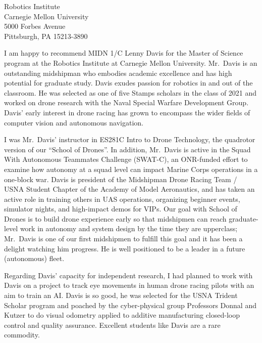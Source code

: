 \documentclass[10pt]{wrceletter}
\date{\today}
\begin{document}
\begin{letter}{%
Robotics Institute\\
Carnegie Mellon University\\
5000 Forbes Avenue\\
Pittsburgh, PA 15213-3890}

\opening{}
\raggedright %
\setlength{\parindent}{15pt} %

I am happy to recommend MIDN 1/C Lenny Davis for the Master of Science program at the Robotics Institute at Carnegie Mellon University.  Mr.~Davis is an outstanding midshipman who embodies academic excellence and has high potential for graduate study. Davis exudes passion for robotics in and out of the classroom. He was selected as one of five Stamps scholars in the class of 2021 and worked on drone research with the Naval Special Warfare Development Group. Davis' early interest in drone racing has grown to encompass the wider fields of computer vision and autonomous navigation.  

I was Mr.~Davis’ instructor in ES281C Intro to Drone Technology, the quadrotor version of our ``School of Drones''. In addition, Mr.~Davis is active in the Squad With Autonomous Teammates Challenge (SWAT-C), an ONR-funded effort to examine how autonomy at a squad level can impact Marine Corps operations in a one-block war. Davis is president of the Midshipman Drone Racing Team / USNA Student Chapter of the Academy of Model Aeronautics, and has taken an active role in training others in UAS operations, organizing beginner events, simulator nights, and high-impact demos for VIPs.  Our goal with School of Drones is to build drone experience early so that midshipmen can reach graduate-level work in autonomy and system design by the time they are upperclass; Mr.~Davis is one of our first midshipmen to fulfill this goal and it has been a delight watching him progress. He is well positioned to be a leader in a future (autonomous) fleet. 

Regarding Davis' capacity for independent research, I had planned to work with Davis on a project to track eye movements in human drone racing pilots with an aim to train an AI.  Davis is so good, he was selected for the USNA Trident Scholar program and poached by the cyber-physical group Professors Donnal and Kutzer to do visual odometry applied to additive manufacturing closed-loop control and quality assurance. Excellent students like Davis are a rare commodity.


\end{letter}
\end{document}
